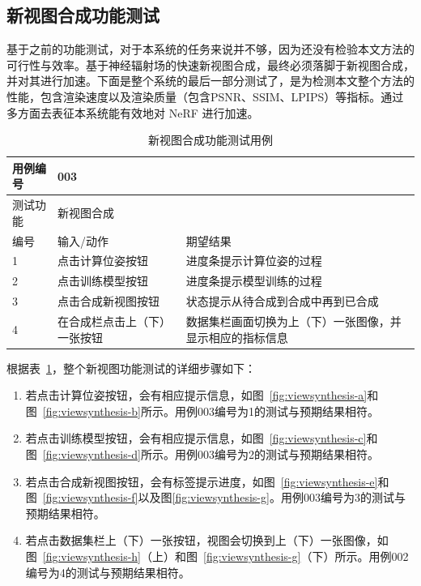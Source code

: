 \subsection{新视图合成功能测试}
基于之前的功能测试，对于本系统的任务来说并不够，因为还没有检验本文方法的可行性与效率。基于神经辐射场的快速新视图合成，最终必须落脚于新视图合成，并对其进行加速。下面是整个系统的最后一部分测试了，是为检测本文整个方法的性能，包含渲染速度以及渲染质量（包含PSNR、SSIM、LPIPS）等指标。通过多方面去表征本系统能有效地对 NeRF 进行加速。
\begin{table}[htbp]
  \centering
  \small{}\setlength{}
  \caption{新视图合成功能测试用例}
  \begin{tabular}{|p{2cm}<{\centering}|p{4cm}<{\centering}|p{4cm}<{\centering}|}
    \hline
    用例编号 & \multicolumn{2}{|l|}{003}       \\
    \hline
    测试功能 & \multicolumn{2}{|l|}{新视图合成}       \\
    \hline
    编号 & 输入/动作 & 期望结果 \\
    \hline
    1 & 点击计算位姿按钮 &  进度条提示计算位姿的过程 \\
    \hline
    2 & 点击训练模型按钮 &  进度条提示模型训练的过程 \\
    \hline
    3 & 点击合成新视图按钮 & 状态提示从待合成到合成中再到已合成 \\
    \hline
    4 & 在合成栏点击上（下）一张按钮 & 数据集栏画面切换为上（下）一张图像，并显示相应的指标信息 \\
    \hline
  \end{tabular}
  \label{tab:viewsynthesis}
\end{table}
根据表~\ref{tab:viewsynthesis}，整个新视图功能测试的详细步骤如下：
\begin{enumerate}
    \item[1)] 若点击计算位姿按钮，会有相应提示信息，如图~\ref{fig:viewsynthesis-a}和图~\ref{fig:viewsynthesis-b}所示。用例003编号为1的测试与预期结果相符。
    \item[2)] 若点击训练模型按钮，会有相应提示信息，如图~\ref{fig:viewsynthesis-c}和图~\ref{fig:viewsynthesis-d}所示。用例003编号为2的测试与预期结果相符。
    \item[3)] 若点击合成新视图按钮，会有标签提示进度，如图~\ref{fig:viewsynthesis-e}和图~\ref{fig:viewsynthesis-f}以及图\ref{fig:viewsynthesis-g}。用例003编号为3的测试与预期结果相符。
    \item[4)] 若点击数据集栏上（下）一张按钮，视图会切换到上（下）一张图像，如图~\ref{fig:viewsynthesis-h}（上）和图~\ref{fig:viewsynthesis-g}（下）所示。用例002编号为4的测试与预期结果相符。
\end{enumerate}
\newpage

